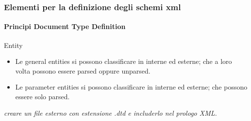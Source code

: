 \begin{frame}
    \frametitle{Elementi per la definizione degli schemi xml}
    \framesubtitle{Principi Document Type Definition}
    \addtocounter{nframe}{1}

    \begin{block}{Entity}
    \begin{itemize}
        \item  Le general entities si possono classificare in interne ed esterne; che a loro volta possono essere parsed oppure unparsed.
        \item Le parameter entities si possono classificare in interne ed esterne; che  possono essere solo parsed.
    \end{itemize}
    \end{block}
    \textit{creare un file esterno con estensione .dtd e includerlo nel prologo XML.}
    
\end{frame}


















